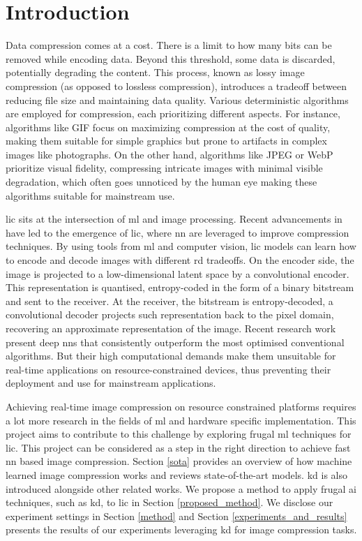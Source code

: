 \documentclass{article}
\begin{document}
\section{Introduction}
Data compression comes at a cost. There is a limit to how many bits can be removed while encoding data. Beyond this threshold, some data is discarded, potentially degrading the content. This process, known as lossy image compression (as opposed to lossless compression), introduces a tradeoff between reducing file size and maintaining data quality. Various deterministic algorithms are employed for compression, each prioritizing different aspects. For instance, algorithms like GIF focus on maximizing compression at the cost of quality, making them suitable for simple graphics but prone to artifacts in complex images like photographs. On the other hand, algorithms like JPEG or WebP prioritize visual fidelity, compressing intricate images with minimal visible degradation, which often goes unnoticed by the human eye making these algorithms suitable for mainstream use.

\acrfull{lic} sits at the intersection of \acrfull{ml} and image processing. Recent advancements in  have led to the emergence of \acrshort{lic}, where \acrfull{nn} are leveraged to improve compression techniques. By using tools from \acrshort{ml} and computer vision, \acrshort{lic} models can learn how to encode and decode images with different \acrfull{rd} tradeoffs. On the encoder side, the image is projected to a low-dimensional latent space by a convolutional encoder. This representation is quantised, entropy-coded in the form of a binary bitstream and sent to the receiver. At the receiver, the bitstream is entropy-decoded, a convolutional decoder projects such representation back to the pixel domain, recovering an approximate representation of the image. Recent research work present deep \acrshort{nn}s that consistently outperform the most optimised conventional algorithms. But their high computational demands make them unsuitable for real-time applications on resource-constrained devices, thus preventing their deployment and use for mainstream applications.

Achieving real-time image compression on resource constrained platforms requires a lot more research in the fields of \acrshort{ml} and hardware specific implementation. This project aims to contribute to this challenge by exploring frugal \acrshort{ml} techniques for \acrshort{lic}. This project can be considered as a step in the right direction to achieve fast \acrshort{nn} based image compression. Section \ref{sota} provides an overview of how machine learned image compression works and reviews state-of-the-art models. \acrfull{kd} is also introduced alongside other related works. We propose a method to apply frugal \acrfull{ai} techniques, such as \acrshort{kd}, to \acrshort{lic} in Section \ref{proposed_method}. We disclose our experiment settings in Section \ref{method} and Section \ref{experiments_and_results} presents the results of our experiments leveraging \acrshort{kd} for image compression tasks.
\end{document}

